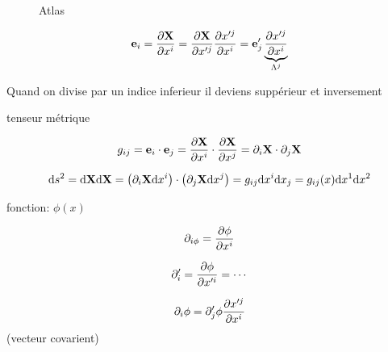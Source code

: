 \begin{figure}[ht]
    \centering
    \caption{Atlas}
    \label{fig:atlas}
\end{figure}

\begin{tcolorbox}[title=Espace tangeant]
    $$\vb{e}_i = \pdv{\vb{X}}{x^{i}} = \pdv{\vb{X}}{x^{\prime{}j}} \pdv{x^{\prime{}j}}{x^i} =\vb{e}'_j \underbrace{\pdv{x^{\prime{}j}}{x^i}}_{\Lambda^j}   $$ 
\end{tcolorbox}

\begin{tcolorbox}[title=Truc mémotechnique]
     Quand on divise par un indice inferieur il deviens suppérieur et inversement
\end{tcolorbox}

tenseur métrique

$$g_{ij} = \vb{e}_i \cdot \vb{e}_j = \pdv{\vb{X}}{x^i} \cdot \pdv{\vb{X}}{x^j} = \partial_i \vb{X} \cdot \partial_j \vb{X}$$ 


$$\dd s^{2}= \dd \vb{X}\dd \vb{X} = \left( \partial_i \vb{X} \dd x^i \right) \cdot \left( \partial_j \vb{X} \dd x^{j} \right) = g_{ij} \dd x^{i}\dd x_j = g_{ij} (x) \dd x^{1}\dd x^2 $$ 

fonction: $\phi(x)$ 

$$\partial_{i\phi} = \pdv{\phi}{x^i} $$ 

$$\partial'_i = \pdv{\phi}{x^{\prime{}i}} = \dotsb$$ 

$$\partial_i \phi = \partial'_j \phi \pdv{x^{\prime{}j}}{x^i} $$ 
(vecteur covarient)




